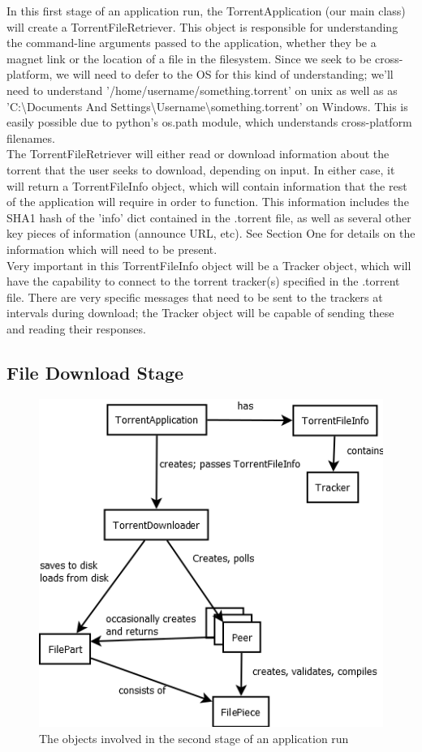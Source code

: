 \documentclass[letter]{scrartcl}
\begin{document}
In this first stage of an application run, the TorrentApplication (our main class) will create a TorrentFileRetriever.  This object is responsible for understanding the command-line arguments passed to the application, whether they be a magnet link or the location of a file in the filesystem.  Since we seek to be cross-platform, we will need to defer to the OS for this kind of understanding; we'll need to understand '/home/username/something.torrent' on unix as well as as 'C:\textbackslash Documents And Settings\textbackslash Username\textbackslash something.torrent' on Windows.  This is easily possible due to python's os.path module, which understands cross-platform filenames.\\

The TorrentFileRetriever will either read or download information about the torrent that the user seeks to download, depending on input.  In either case, it will return a TorrentFileInfo object, which will contain information that the rest of the application will require in order to function.  This information includes the SHA1 hash of the 'info' dict contained in the .torrent file, as well as several other key pieces of information (announce URL, etc).  See Section One for details on the information which will need to be present.\\

Very important in this TorrentFileInfo object will be a Tracker object, which will have the capability to connect to the torrent tracker(s) specified in the .torrent file.  There are very specific messages that need to be sent to the trackers at intervals during download; the Tracker object will be capable of sending these and reading their responses.

\subsection{File Download Stage}

\begin{figure}[h]
\centering
\includegraphics[scale=.5]{StepTwo.png}
\caption{The objects involved in the second stage of an application run}
\end{figure}
\end{document}
